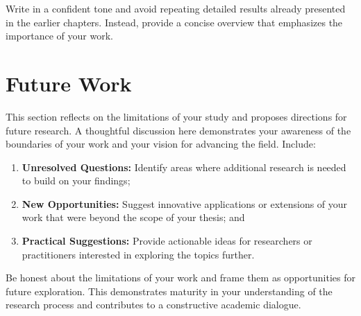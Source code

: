 Write in a confident tone and avoid repeating detailed results already presented in the earlier chapters. Instead, provide a concise overview that emphasizes the importance of your work.

\section{Future Work}
This section reflects on the limitations of your study and proposes directions for future research. A thoughtful discussion here demonstrates your awareness of the boundaries of your work and your vision for advancing the field. Include:
\begin{enumerate}
    \item \textbf{Unresolved Questions:} Identify areas where additional research is needed to build on your findings;
    \item \textbf{New Opportunities:} Suggest innovative applications or extensions of your work that were beyond the scope of your thesis; and
    \item \textbf{Practical Suggestions:} Provide actionable ideas for researchers or practitioners interested in exploring the topics further.
\end{enumerate}

Be honest about the limitations of your work and frame them as opportunities for future exploration. This demonstrates maturity in your understanding of the research process and contributes to a constructive academic dialogue.
